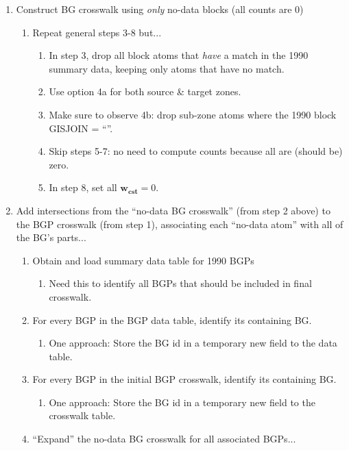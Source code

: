 \documentclass{article}
\begin{document}
\begin{enumerate}
\item Construct BG crosswalk using \textit{only} no-data blocks (all counts are 0)
  \begin{enumerate}
    \item Repeat general steps 3-8 but...
      \begin{enumerate}
      \item In step 3, drop all block atoms that \textit{have} a match in the 1990 summary data, keeping only atoms that have no match.
      \item Use option 4a for both source \& target zones.
      \item Make sure to observe 4b: drop sub-zone atoms where the 1990 block GISJOIN = ``''.
      \item Skip steps 5-7: no need to compute counts because all are (should be) zero.
      \item In step 8, set all $\bm{w_{\mathbf{cst}}} = 0$.
      \end{enumerate}
    \end{enumerate}
\item Add intersections from the ``no-data BG crosswalk'' (from step 2 above) to the BGP crosswalk (from step 1), associating each ``no-data atom'' with all of the BG's parts...
    \begin{enumerate}
    \item Obtain and load summary data table for 1990 BGPs
        \begin{enumerate}
        \item Need this to identify all BGPs that should be included in final crosswalk.
        \end{enumerate}
    \item For every BGP in the BGP data table, identify its containing BG.
        \begin{enumerate}
        \item One approach: Store the BG id in a temporary new field to the data table.
        \end{enumerate}
    \item For every BGP in the initial BGP crosswalk, identify its containing BG.
        \begin{enumerate}
        \item One approach: Store the BG id in a temporary new field to the crosswalk table.
        \end{enumerate}
    \item ``Expand'' the no-data BG crosswalk for all associated BGPs...
        \begin{enumerate}

\end{enumerate}
\end{enumerate}
\end{enumerate}
\end{document}
